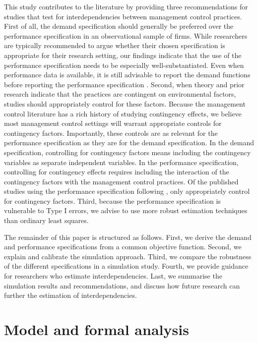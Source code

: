 \documentclass[12pt]{article}
\begin{document}
This study contributes to the literature by providing three recommendations for studies that test for interdependencies between management control practices. First of all, the demand specification should generally be preferred over the performance specification in an observational sample of firms. While researchers are typically recommended to argue whether their chosen specification is appropriate for their research setting, our findings indicate that the use of the performance specification needs to be especially well-substantiated. Even when performance data is available, it is still advisable to report the demand functions before reporting the performance specification \citep{aral_three-way_2012, cassiman_search_2006}. Second, when theory and prior research indicate that the practices are contingent on environmental factors, studies should appropriately control for these factors. Because the management control literature has a rich history of studying contingency effects, we believe most management control settings will warrant appropriate controls for contingency factors. Importantly, these controls are as relevant for the performance specification as they are for the demand specification. In the demand specification, controlling for contingency factors means including the contingency variables as separate independent variables. In the performance specification, controlling for contingency effects requires including the interaction of the contingency factors with the management control practices. Of the published studies using the performance specification following \citet{grabner_management_2013}, only \citet{bedford_management_2016, bedford_performance_2019} appropriately control for contingency factors. Third, because the performance specification is vulnerable to Type I errors, we advise to use more robust estimation techniques than ordinary least squares.

The remainder of this paper is structured as follows. First, we derive the demand and performance specifications from a common objective function. Second, we explain and calibrate the simulation approach. Third, we compare the robustness of the different specifications in a simulation study. Fourth, we provide guidance for researchers who estimate interdependencies. Last, we summarise the simulation results and recommendations, and discuss how future research can further the estimation of interdependencies.

\section{Model and formal analysis}\label{model-and-formal-analysis}
\end{document}
